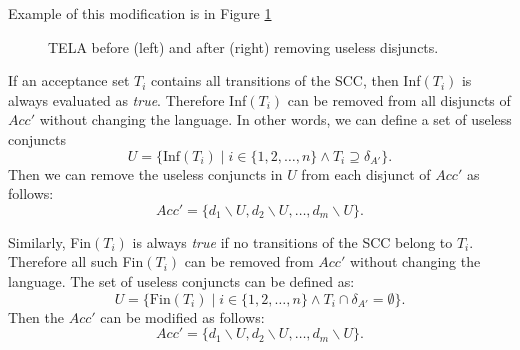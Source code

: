 \documentclass[
  digital, %
  twoside, %
  table,   %
  lof,     %
  lot,     %
]{fithesis3}
\begin{document}
Example of this modification is in Figure \ref{fig:rem_dis_inf}

\begin{figure}[h]
  \centering
  \caption{TELA before (left) and after (right) removing useless disjuncts.}
  \label{fig:rem_dis_inf}
\end{figure}

If an acceptance set $T_i$ contains all transitions of the SCC, then Inf$(T_i)$ is always evaluated as \emph{true}. Therefore Inf$(T_i)$ can be removed from all disjuncts of $Acc'$ without changing the language. 
In other words, we can define a set of useless conjuncts 
\begin{equation*}
  U = \{\text{Inf}(T_i) \mid i \in \{1,2, \dots, n\} \wedge T_i \supseteq \delta_{A'}\}.
\end{equation*}
Then we can remove the useless conjuncts in $U$ from each disjunct of $Acc'$ as follows:
\begin{equation*}
  Acc' = \{d_1 \smallsetminus U, d_2 \smallsetminus U, \dots, d_m \smallsetminus U\}.
\end{equation*}

Similarly, Fin$(T_i)$ is always \emph{true} if no transitions of the SCC belong to $T_i$. Therefore all such Fin$(T_i)$ can be removed from $Acc'$ without changing the language.
The set of useless conjuncts can be defined as:
\begin{equation*}
  U = \{\text{Fin}(T_i) \mid i \in \{1,2, \dots, n\} \wedge T_i \cap \delta_{A'} = \emptyset\}.
\end{equation*}
Then the $Acc'$ can be modified as follows:
\begin{equation*}
  Acc' = \{d_1 \smallsetminus U, d_2 \smallsetminus U, \dots, d_m \smallsetminus U\}.
\end{equation*}
\end{document}
